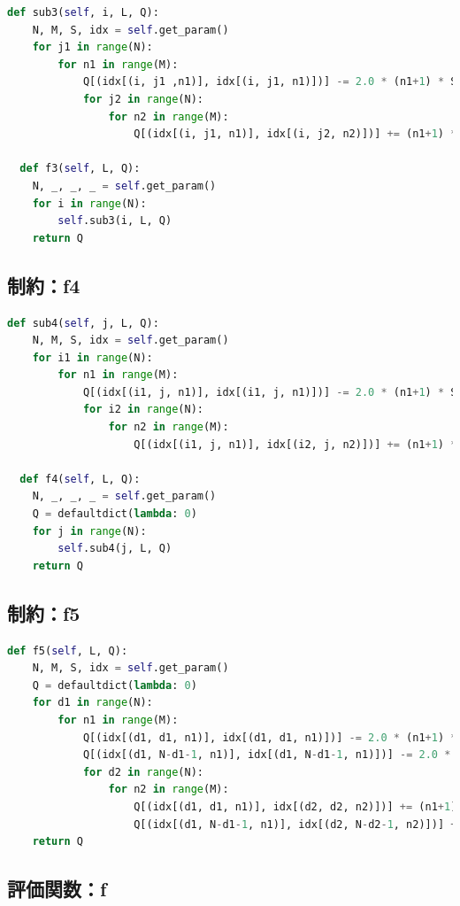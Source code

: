 \documentclass[uplatex,dvipdfmx,a4paper,11pt,oneside,openany]{jsbook}
\begin{document}
\begin{lstlisting}[language=Python]
  def sub3(self, i, L, Q):
    N, M, S, idx = self.get_param()
    for j1 in range(N):
        for n1 in range(M):
            Q[(idx[(i, j1 ,n1)], idx[(i, j1, n1)])] -= 2.0 * (n1+1) * S * L
            for j2 in range(N):
                for n2 in range(M):
                    Q[(idx[(i, j1, n1)], idx[(i, j2, n2)])] += (n1+1) * (n2+1) * L

  def f3(self, L, Q):
    N, _, _, _ = self.get_param()
    for i in range(N):
        self.sub3(i, L, Q)
    return Q
\end{lstlisting}

\subsection{制約：f4}

\begin{lstlisting}[language=Python]
  def sub4(self, j, L, Q):
    N, M, S, idx = self.get_param()
    for i1 in range(N):
        for n1 in range(M):
            Q[(idx[(i1, j, n1)], idx[(i1, j, n1)])] -= 2.0 * (n1+1) * S * L
            for i2 in range(N):
                for n2 in range(M):
                    Q[(idx[(i1, j, n1)], idx[(i2, j, n2)])] += (n1+1) * (n2+1) * L

  def f4(self, L, Q):
    N, _, _, _ = self.get_param()
    Q = defaultdict(lambda: 0)
    for j in range(N):
        self.sub4(j, L, Q)
    return Q
\end{lstlisting}

\subsection{制約：f5}

\begin{lstlisting}[language=Python]
  def f5(self, L, Q):
    N, M, S, idx = self.get_param()
    Q = defaultdict(lambda: 0)
    for d1 in range(N):
        for n1 in range(M):
            Q[(idx[(d1, d1, n1)], idx[(d1, d1, n1)])] -= 2.0 * (n1+1) * S * L
            Q[(idx[(d1, N-d1-1, n1)], idx[(d1, N-d1-1, n1)])] -= 2.0 * (n1 + 1) * S * L
            for d2 in range(N):
                for n2 in range(M):
                    Q[(idx[(d1, d1, n1)], idx[(d2, d2, n2)])] += (n1+1) * (n2+1) * L
                    Q[(idx[(d1, N-d1-1, n1)], idx[(d2, N-d2-1, n2)])] += (n1 + 1) * (n2 + 1) * L
    return Q
\end{lstlisting}

\subsection{評価関数：f}
\end{document}
